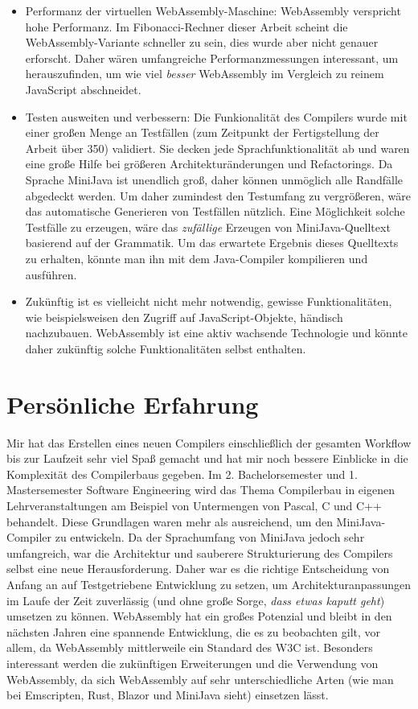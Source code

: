 \begin{itemize}
    \item Performanz der virtuellen WebAssembly-Maschine: WebAssembly verspricht hohe Performanz. Im Fibonacci-Rechner dieser Arbeit scheint die WebAssembly-Variante schneller zu sein, dies wurde aber nicht genauer erforscht. Daher wären umfangreiche Performanzmessungen interessant, um herauszufinden, um wie viel \emph{besser} WebAssembly im Vergleich zu reinem JavaScript abschneidet.
    \item Testen ausweiten und verbessern: Die Funkionalität des Compilers wurde mit einer großen Menge an Testfällen (zum Zeitpunkt der Fertigstellung der Arbeit über 350) validiert. Sie decken jede Sprachfunktionalität ab und waren eine große Hilfe bei größeren Architekturänderungen und Refactorings. Da Sprache MiniJava ist unendlich groß, daher können unmöglich alle Randfälle abgedeckt werden. Um daher zumindest den Testumfang zu vergrößeren, wäre das automatische Generieren von Testfällen nützlich. Eine Möglichkeit solche Testfälle zu erzeugen, wäre das \emph{zufällige} Erzeugen von MiniJava-Quelltext basierend auf der Grammatik. Um das erwartete Ergebnis dieses Quelltexts zu erhalten, könnte man ihn mit dem Java-Compiler kompilieren und ausführen.
    \item Zukünftig ist es vielleicht nicht mehr notwendig, gewisse Funktionalitäten, wie beispielsweisen den Zugriff auf JavaScript-Objekte, händisch nachzubauen. WebAssembly ist eine aktiv wachsende Technologie und könnte daher zukünftig solche Funktionalitäten selbst enthalten.
\end{itemize}

\section{Persönliche Erfahrung}

Mir hat das Erstellen eines neuen Compilers einschließlich der gesamten Workflow bis zur Laufzeit sehr viel Spaß gemacht und hat mir noch bessere Einblicke in die Komplexität des Compilerbaus gegeben. Im 2. Bachelorsemester und 1. Mastersemester Software Engineering wird das Thema Compilerbau in eigenen Lehrveranstaltungen am Beispiel von Untermengen von Pascal, C und C++ behandelt. Diese Grundlagen waren mehr als ausreichend, um den MiniJava-Compiler zu entwickeln. Da der Sprachumfang von MiniJava jedoch sehr umfangreich, war die Architektur und sauberere Strukturierung des Compilers selbst eine neue Herausforderung. Daher war es die richtige Entscheidung von Anfang an auf Testgetriebene Entwicklung zu setzen, um Architekturanpassungen im Laufe der Zeit zuverlässig (und ohne große Sorge, \emph{dass etwas kaputt geht}) umsetzen zu können. WebAssembly hat ein großes Potenzial und bleibt in den nächsten Jahren eine spannende Entwicklung, die es zu beobachten gilt, vor allem, da WebAssembly mittlerweile ein Standard des W3C ist. Besonders interessant werden die zukünftigen Erweiterungen und die Verwendung von WebAssembly, da sich WebAssembly auf sehr unterschiedliche Arten (wie man bei Emscripten, Rust, Blazor und MiniJava sieht) einsetzen lässt.

